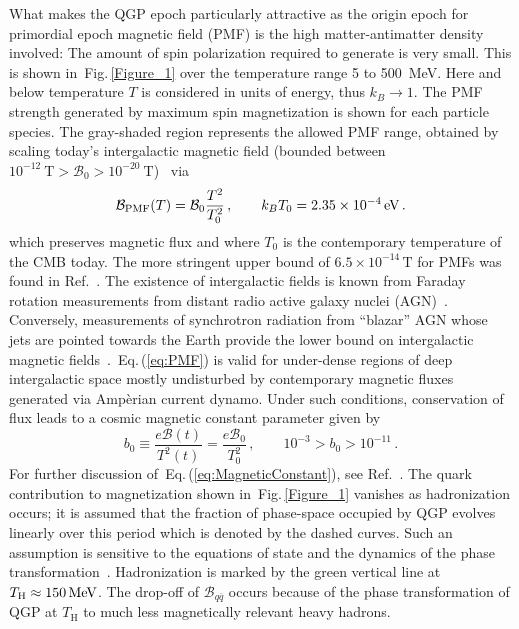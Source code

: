 \documentclass[epjST]{svjour}
\newcommand*{\MeV}{\text{\,MeV}}
\newcommand*{\eV}{\text{\,eV}}
\newcommand{\req}[1]{Eq.\,(\ref{#1})}
\newcommand{\rf}[1]{Fig.\,{\ref{#1}}}
\begin{document}
{\color{blue} What makes the QGP epoch particularly attractive as the origin epoch for primordial epoch magnetic field (PMF)  is the high matter-antimatter density involved: The amount of spin polarization required to generate is very small.} This is shown in~\rf{Figure_1} over the temperature range 5 to 500~MeV. {\color{blue}Here and below temperature $T$ is considered in units of energy, thus \(k_{B}\to 1\).  The PMF strength generated by maximum spin magnetization is shown for each particle species. The gray-shaded region represents the allowed PMF range, obtained by scaling today’s intergalactic magnetic field (bounded between \(10^{-12}~\mathrm{T} > \mathcal{B}_{0} > 10^{-20}~\mathrm{T}\))~\cite{Planck:2015zrl,Jedamzik:2018itu} via
\begin{equation}
\label{eq:PMF}
\mathcal{B}_\mathrm{PMF}(T) = \mathcal{B}_{0}\frac{T^{2}}{T_{0}^{2}}\,,\qquad
k_{B}T_{0} = 2.35\times10^{-4}\eV\,.
\end{equation}
which preserves magnetic flux and where \(T_{0}\) is the contemporary temperature of the CMB today. The more stringent upper bound of \(6.5\times10^{-14}\,\mathrm{T}\) for PMFs was found in Ref.~\cite{Pshirkov:2015tua}. The existence of intergalactic fields is known from Faraday rotation measurements from distant radio active galaxy nuclei (AGN)~\cite{Pomakov:2022cem}. Conversely, measurements of synchrotron radiation from ``blazar'' AGN whose jets are pointed towards the Earth provide the lower bound on intergalactic magnetic fields~\cite{Neronov:2010gir}.~\req{eq:PMF} is valid for under-dense regions of deep intergalactic space mostly undisturbed by contemporary magnetic fluxes generated via Amp{\`e}rian current dynamo. Under such conditions, conservation of flux leads to a cosmic magnetic constant parameter given by
\begin{equation}
\label{eq:MagneticConstant}
b_{0} \equiv \frac{e\mathcal{B}(t)}{T^{2}(t)}=\frac{e\mathcal{B}_{0}}{T_{0}^{2}}\,,\qquad
10^{-3} > b_{0} > 10^{-11}\,.
\end{equation}
For further discussion of~\req{eq:MagneticConstant}, see Ref.~\cite{Steinmetz:2023nsc}. The quark contribution to magnetization shown in~\rf{Figure_1} vanishes as hadronization occurs; it is assumed that the fraction of phase-space occupied by QGP evolves linearly over this period which is denoted by the dashed curves. Such an assumption is sensitive to the equations of state and the dynamics of the phase transformation~\cite{Fromerth:2012fe}.} Hadronization is marked by the green vertical line at \(T_\mathrm{H}\approx150\MeV\). The drop-off of \(\mathcal{B}_{q\bar{q}}\) occurs because of the phase transformation of QGP at \(T_\mathrm{H}\) to much less magnetically relevant heavy hadrons.
\end{document}
